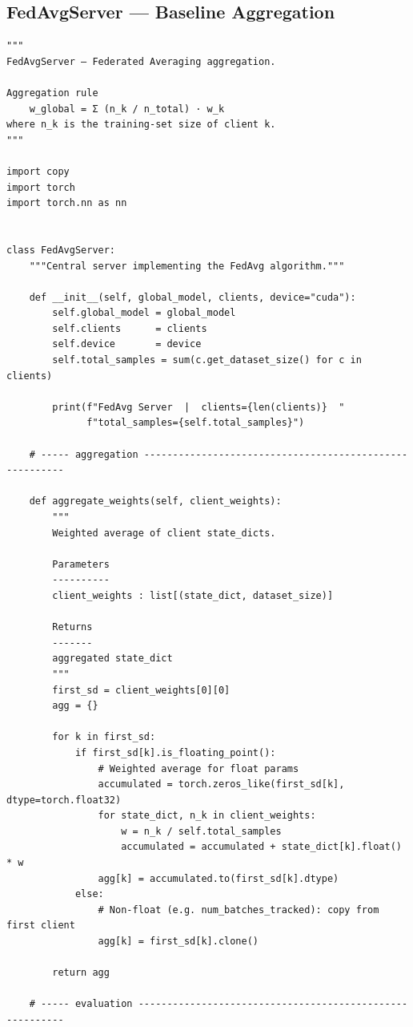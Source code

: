 \subsection{FedAvgServer --- Baseline Aggregation}
\begin{lstlisting}[caption={FedAvg Server (server\_fedavg.py)}, label={lst:fedavg}]
"""
FedAvgServer — Federated Averaging aggregation.

Aggregation rule
    w_global = Σ (n_k / n_total) · w_k
where n_k is the training-set size of client k.
"""

import copy
import torch
import torch.nn as nn


class FedAvgServer:
    """Central server implementing the FedAvg algorithm."""

    def __init__(self, global_model, clients, device="cuda"):
        self.global_model = global_model
        self.clients      = clients
        self.device       = device
        self.total_samples = sum(c.get_dataset_size() for c in clients)

        print(f"FedAvg Server  |  clients={len(clients)}  "
              f"total_samples={self.total_samples}")

    # ----- aggregation --------------------------------------------------------

    def aggregate_weights(self, client_weights):
        """
        Weighted average of client state_dicts.

        Parameters
        ----------
        client_weights : list[(state_dict, dataset_size)]

        Returns
        -------
        aggregated state_dict
        """
        first_sd = client_weights[0][0]
        agg = {}

        for k in first_sd:
            if first_sd[k].is_floating_point():
                # Weighted average for float params
                accumulated = torch.zeros_like(first_sd[k], dtype=torch.float32)
                for state_dict, n_k in client_weights:
                    w = n_k / self.total_samples
                    accumulated = accumulated + state_dict[k].float() * w
                agg[k] = accumulated.to(first_sd[k].dtype)
            else:
                # Non-float (e.g. num_batches_tracked): copy from first client
                agg[k] = first_sd[k].clone()

        return agg

    # ----- evaluation ---------------------------------------------------------


\end{lstlisting}
